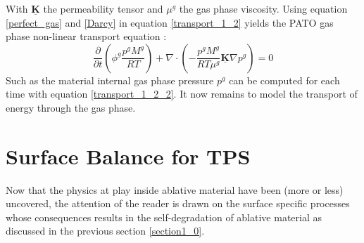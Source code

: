 \documentclass[english,10pt,a4paper,oneside,twocolumn,titlepage]{report}
\begin{document}
	With $\underline{\mathbf{K}}$ the permeability tensor 
	and $\mu^g$ the gas phase viscosity. Using equation 
	\eqref{perfect_gas} and \eqref{Darcy} in equation 
	\eqref{transport_1_2} yields the PATO gas phase 
	non-linear transport equation \cite{Lachaud2017}:
	\begin{equation}
	\label{transport_1_2_2}
	\frac{\partial}{\partial t} \left( \phi^g 
	\frac{p^g M^g}{RT}\right)
	+ \nabla \cdot \left(- \frac{p^g M^g}{RT\mu^g}
	\underline{\mathbf{K}} \nabla p^g \right)
	= 0
	\end{equation}
	Such as the material internal gas phase pressure $p^g$ 
	can be computed for each time with equation 
	\eqref{transport_1_2_2}. It now remains to model 
	the transport of energy through the gas phase.
	
	
	\section{Surface Balance for TPS}
	\label{section2_0}
	Now that the physics at play inside ablative material have
	been (more or less) uncovered, the attention of the 
	reader is drawn on the surface specific processes whose 
	consequences results in the self-degradation of ablative
	material as discussed in the previous section 
	\ref{section1_0}.

	\pagebreak
	\appendix

	
	
	
	
	
\end{document}

